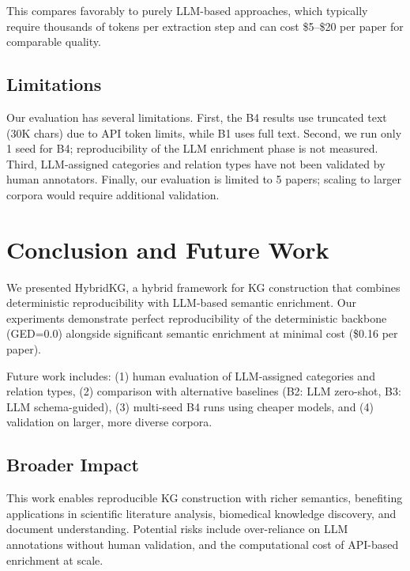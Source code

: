 \documentclass{article}
\newcommand{\method}{HybridKG\xspace}
\begin{document}
This compares favorably to purely LLM-based approaches, which typically require thousands of tokens per extraction step and can cost \$5--\$20 per paper for comparable quality.

\subsection{Limitations}

Our evaluation has several limitations. First, the B4 results use truncated text (30K chars) due to API token limits, while B1 uses full text. Second, we run only 1 seed for B4; reproducibility of the LLM enrichment phase is not measured. Third, LLM-assigned categories and relation types have not been validated by human annotators. Finally, our evaluation is limited to 5 papers; scaling to larger corpora would require additional validation.

\section{Conclusion and Future Work}

We presented \method, a hybrid framework for KG construction that combines deterministic reproducibility with LLM-based semantic enrichment. Our experiments demonstrate perfect reproducibility of the deterministic backbone (GED=0.0) alongside significant semantic enrichment at minimal cost (\$0.16 per paper).

Future work includes: (1) human evaluation of LLM-assigned categories and relation types, (2) comparison with alternative baselines (B2: LLM zero-shot, B3: LLM schema-guided), (3) multi-seed B4 runs using cheaper models, and (4) validation on larger, more diverse corpora.

\subsection*{Broader Impact}
This work enables reproducible KG construction with richer semantics, benefiting applications in scientific literature analysis, biomedical knowledge discovery, and document understanding. Potential risks include over-reliance on LLM annotations without human validation, and the computational cost of API-based enrichment at scale.



\end{document}
